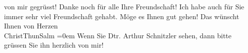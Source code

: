 \begin{ledgroupsized}[t]{13cm}
               von mir gegrüsst!\pend
           \pstart
           {\pb}Danke noch für alle Ihre
               Freundschaft! Ich habe auch für Sie immer sehr viel Freundschaft gehabt.\pend
           \pstart
           Möge es Ihnen gut gehen! Das wünscht Ihnen von
                  Herzen{\\[\baselineskip]}\spacefill\mbox{ChristThunSalm}\pend
           \leftskip=0em{}\pstart
           \noindent{}Wenn Sie Dtr. Arthur Schnitzler sehen, dann bitte grüssen Sie ihn herzlich von
                  mir!\pend
                     \endnumbering{}\end{ledgroupsized}  \newcommand{\dateiname}{L01678}\newcommand{\titel}{Hugo von Hofmannsthal an Arthur Schnitzler mit Beilage Christiane Thun an Hofmannsthal, [25. 5. 1907]}\newcommand{\editorInnen}{Martin Anton Müller und Gerd-Hermann Susen}
      